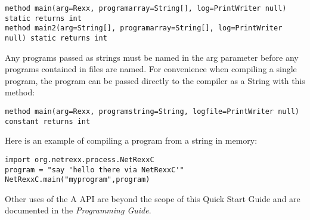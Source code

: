 \begin{lstlisting}[label=frommemory,caption=From Memory]
method main(arg=Rexx, programarray=String[], log=PrintWriter null) static returns int
method main2(arg=String[], programarray=String[], log=PrintWriter null) static returns int
\end{lstlisting}

Any programs passed as strings must be named in the arg parameter before any programs contained in files are named.
For convenience when compiling a single program, the program can be
passed directly to the compiler as a String with this method:

\begin{lstlisting}[label=string,caption=With String argument]
method main(arg=Rexx, programstring=String, logfile=PrintWriter null) constant returns int
\end{lstlisting}

Here is an example of compiling a \nr{} program from a string in
memory:

\begin{lstlisting}[label=memexample,caption=Example of compiling from String]
import org.netrexx.process.NetRexxC
program = "say 'hello there via NetRexxC'"
NetRexxC.main("myprogram",program)
\end{lstlisting}

Other uses of the \nr{}A API are beyond the scope
of this Quick Start Guide and are documented in the \emph{Programming Guide}.